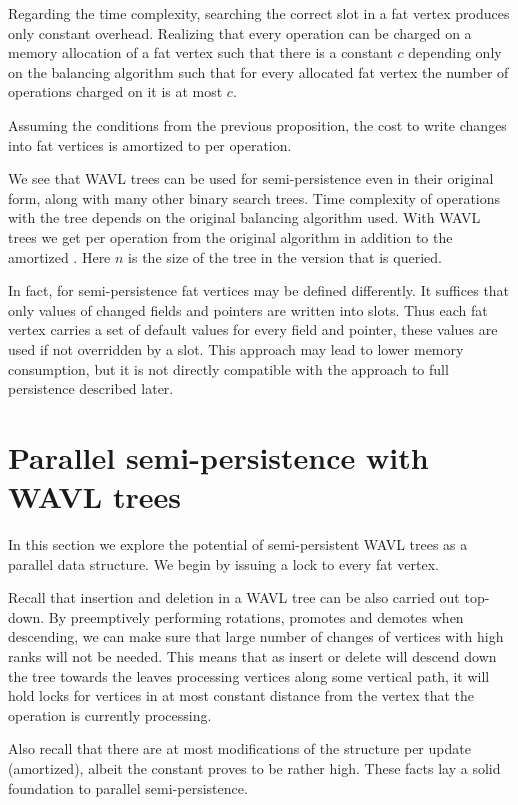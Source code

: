 Regarding the time complexity, searching the correct slot in a fat vertex produces only constant overhead. 
Realizing that every operation can be charged on a memory allocation of a fat vertex such that there is a constant $c$ depending only on the balancing algorithm such that for every allocated fat vertex the number of operations charged on it is at most $c$.

\begin{obs}
Assuming the conditions from the previous proposition, the cost to write changes into fat vertices is amortized to  per operation.
\end{obs}

We see that WAVL trees can be used for semi-persistence even in their original form, along with many other binary search trees. Time complexity of operations with the tree depends on the original balancing algorithm used. With WAVL trees we get  per operation from the original algorithm in addition to the amortized . Here $n$ is the size of the tree in the version that is queried.

In fact, for semi-persistence fat vertices may be defined differently. It suffices that only values of changed fields and pointers are written into slots. 
Thus each fat vertex carries a set of default values for every field and pointer, these values are used if not overridden by a slot. 
This approach may lead to lower memory consumption, but it is not directly compatible with the approach to full persistence described later.

\section{Parallel semi-persistence with WAVL trees}

In this section we explore the potential of semi-persistent WAVL trees as a parallel data structure. 
We begin by issuing a lock to every fat vertex.

Recall that insertion and deletion in a WAVL tree can be also carried out top-down.
By preemptively performing rotations, promotes and demotes when descending, we can make sure that large number of changes of vertices with high ranks will not be needed. This means that as insert or delete will descend down the tree towards the leaves processing vertices along some vertical path, it will hold locks for vertices in at most constant distance from the vertex that the operation is currently processing.

Also recall that there are at most  modifications of the structure per update (amortized), albeit the constant proves to be rather high. These facts lay a solid foundation to parallel semi-persistence.

